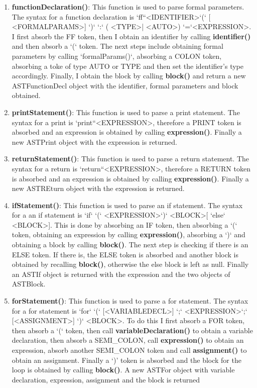 \documentclass{article}
\begin{document}
\begin{enumerate}
						\item \textbf{functionDeclaration()}: This function is used to parse formal parameters. The syntax for a function declaration is `ff``\textless IDENTIFIER\textgreater `(` [ \textless FORMALPARAMS\textgreater]  `)` `:` ( \textless TYPE\textgreater | \textless AUTO\textgreater ) `=`\textless EXPRESSION\textgreater. I first absorb the FF token, then I obtain an identifier by calling \textbf{identifier()} and then absorb a `(` token. The next steps include obtaining formal parameters by calling `formalParams()`, absorbing a COLON token, absorbing a toke of type AUTO or TYPE and then set the identifier's type accordingly. Finally, I obtain the block by calling \textbf{block()} and return a new ASTFunctionDecl object with the identifier, formal parameters and block obtained.
			
						\item \textbf{printStatement()}: This function is used to parse a print statement. The syntax for a print is `print``\textless EXPRESSION\textgreater, therefore a PRINT token is absorbed and an expression is obtained by calling \textbf{expression()}. Finally a new ASTPrint object with the expression is returned.			
				
						\item \textbf{returnStatement()}: This function is used to parse a return statement. The syntax for a return is `return``\textless EXPRESSION\textgreater, therefore a RETURN token is absorbed and an expression is obtained by calling \textbf{expression()}. Finally a new ASTREturn object with the expression is returned.					

						
						\item \textbf{ifStatement()}: This function is used to parse an if statement. The syntax for a an if statement is `if` `(` \textless EXPRESSION\textgreater `)` \textless BLOCK\textgreater [ `else` \textless BLOCK\textgreater ]. This is done by absorbing an IF token, then absorbing a `(` token, obtaining an expression by calling \textbf{expression()}, absorbing a `)` and obtaining a block by calling \textbf{block()}. The next step is checking if there is an ELSE token. If there is, the ELSE token is absorbed and another block is obtained by recalling \textbf{block()}, otherwise the else block is left as null. Finally an ASTIf object is returned with the expression and the two objects of ASTBlock.
						
						\item \textbf{forStatement()}: This function is used to parse a for statement. The syntax for a for statement is `for` `(` [\textless VARIABLEDECL\textgreater] `;` \textless EXPRESSION\textgreater `;` [\textless ASSIGNMENT\textgreater] `)` \textless BLOCK\textgreater. To do this I first absorb a FOR token, then absorb a `(` token, then call \textbf{variableDeclaration()} to obtain a variable declaration, then absorb a SEMI\_COLON, call \textbf{expression()} to obtain an expression, absorb another SEMI\_COLON token and call \textbf{assignment()} to obtain an assignment. Finally a `)' token is absorbed and the block for the loop is obtained by calling \textbf{block()}. A new ASTFor object with variable declaration, expression, assignment and the block is returned
			

\end{enumerate}
\end{document}
